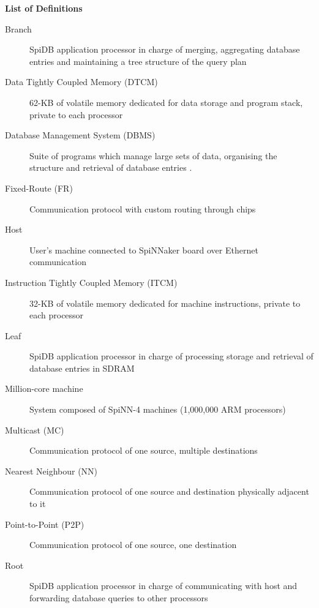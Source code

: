 \vspace*{1.5cm}
{ \huge \bfseries List of Definitions}
\vspace{7mm}

\small
\begin{description}

  \item[Branch] SpiDB application processor in charge of merging, aggregating database entries and maintaining a tree structure of the query plan

  \item[Data Tightly Coupled Memory (DTCM)] 62-KB of volatile memory dedicated for data storage and program stack, private to each processor
  
  \item[Database Management System (DBMS)] Suite of programs which manage large sets of data, organising the structure and retrieval of database entries \cite{dbmsdef}.
   
  \item[Fixed-Route (FR)] Communication protocol with custom routing through chips   

  \item[Host] User's machine connected to SpiNNaker board over Ethernet communication    

  \item[Instruction Tightly Coupled Memory (ITCM)] 32-KB of volatile memory dedicated for machine instructions, private to each processor    

  \item[Leaf] SpiDB application processor in charge of processing storage and retrieval of database entries in SDRAM    

  \item[Million-core machine] System composed of  SpiNN-4 machines (1,000,000 ARM processors)   

  \item[Multicast (MC)] Communication protocol of one source, multiple destinations    

  \item[Nearest Neighbour (NN)] Communication protocol of one source and destination physically adjacent to it

  \item[Point-to-Point (P2P)] Communication protocol of one source, one destination    

  \item[Root] SpiDB application processor in charge of communicating with host and forwarding database queries to other processors


\end{description}
